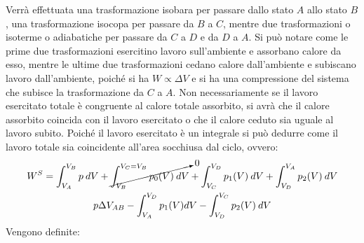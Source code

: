 \documentclass{article}
\numberwithin{equation}{subsection}
\begin{document}
Verrà effettuata una trasformazione isobara per 
passare dallo stato $A$ allo stato $B$, una trasformazione 
isocopa per passare da $B$ a $C$, mentre due trasformazioni 
o isoterme o adiabatiche per passare da $C$ a $D$ e da $D$ a $A$. 
Si può notare come le prime due trasformazioni esercitino 
lavoro sull'ambiente e assorbano calore da esso, mentre 
le ultime due trasformazioni cedano calore dall'ambiente e 
subiscano lavoro dall'ambiente, poiché si ha $W\propto \Delta V$ 
e si ha una compressione del sistema che subisce la trasformazione 
da $C$ a $A$. Non necessariamente se il lavoro esercitato totale è 
congruente al calore totale assorbito, si avrà che il calore 
assorbito coincida con il lavoro esercitato o che il calore 
ceduto sia uguale al lavoro subito. Poiché il lavoro esercitato 
è un integrale si può dedurre come il lavoro totale sia 
coincidente all'area socchiusa dal ciclo, ovvero:
\begin{gather*}
    W^S=\displaystyle\int_{V_A}^{V_B}p\:dV+\cancelto{0}{\int_{V_B}^{V_C=V_B}p_0(V)\:dV}+\int_{V_C}^{V_D}p_1(V)\:dV+\int_{V_D}^{V_A}p_2(V)\:dV\\
    p\Delta V_{AB}-\int_{V_A}^{V_D}p_1(V)dV-\int_{V_D}^{V_C}p_2(V)\:dV
\end{gather*}
Vengono definite:
\end{document}
